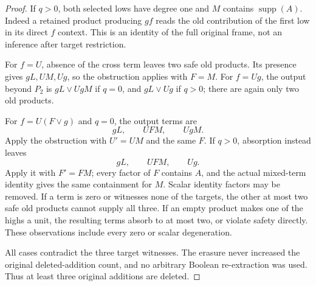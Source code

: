 \documentclass[11pt]{article}
\newcommand{\supp}{\operatorname{supp}}
\theoremstyle{definition}
\theoremstyle{remark}
\begin{document}
\begin{proof}
If $q>0$, both selected lows have degree one and $M$ contains $\supp(A)$. Indeed a retained product producing $gf$ reads the old contribution of the first low in its direct $f$ context. This is an identity of the full original frame, not an inference after target restriction.

For $f=U$, absence of the cross term leaves two safe old products. Its presence gives $gL,UM,Ug$, so the obstruction applies with $F=M$. For $f=Ug$, the output beyond $P_2$ is $gL\vee UgM$ if $q=0$, and $gL\vee Ug$ if $q>0$; there are again only two old products.

For $f=U(F\vee g)$ and $q=0$, the output terms are
\[
 gL,\qquad UFM,\qquad UgM.
\]
Apply the obstruction with $U'=UM$ and the same $F$. If $q>0$, absorption instead leaves
\[
 gL,\qquad UFM,\qquad Ug.
\]
Apply it with $F'=FM$; every factor of $F$ contains $A$, and the actual mixed-term identity gives the same containment for $M$. Scalar identity factors may be removed. If a term is zero or witnesses none of the targets, the other at most two safe old products cannot supply all three. If an empty product makes one of the highs a unit, the resulting terms absorb to at most two, or violate safety directly. These observations include every zero or scalar degeneration.

All cases contradict the three target witnesses. The erasure never increased the original deleted-addition count, and no arbitrary Boolean re-extraction was used. Thus at least three original additions are deleted.
\end{proof}
\end{document}
